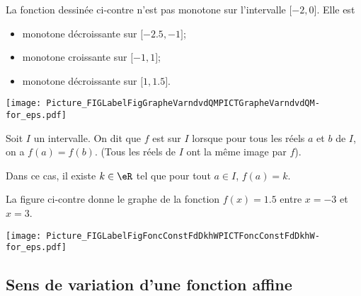 \begin{multicols}{2}

    La fonction dessinée ci-contre n'est pas monotone sur l'intervalle \( \mathopen[ -2 , 0 \mathclose]\). Elle est
    \begin{itemize}
        \item 
            monotone décroissante sur \( \mathopen[ -2.5 , -1 \mathclose]\);
        \item
            monotone croissante sur \( \mathopen[ -1 , 1 \mathclose]\);
        \item
            monotone décroissante sur \( \mathopen[ 1 , 1.5 \mathclose]\).
    \end{itemize}

\columnbreak

\texttt{[image: Picture\_FIGLabelFigGrapheVarndvdQMPICTGrapheVarndvdQM-for\_eps.pdf]}

\end{multicols}


%


\begin{definition}
    Soit \( I\) un intervalle. On dit que $f$ est  sur $I$ lorsque pour tous les réels $a$ et $b$ de $I$, on a $f(a)=f(b)$. (Tous les réels de $I$ ont la même image par $f$).
\end{definition}

\begin{multicols}{2}
    Dans ce cas, il existe $k\in\eR$ tel que pour tout $a\in I$, $f(a)=k$. 
    
    La figure ci-contre donne le graphe de la fonction \( f(x)=1.5\) entre \( x=-3\) et \( x=3\).

\columnbreak

\texttt{[image: Picture\_FIGLabelFigFoncConstFdDkhWPICTFoncConstFdDkhW-for\_eps.pdf]}

\end{multicols}

%

\subsection{Sens de variation d'une fonction affine}

